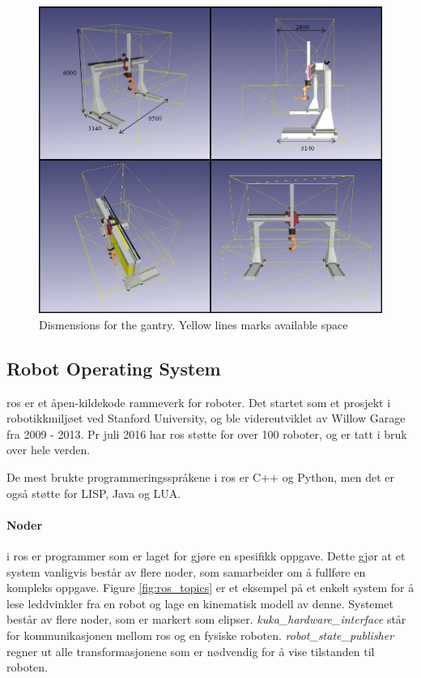 \documentclass{article}
\begin{document}
\begin{figure}[!htbp]
    \centering
    \includegraphics[width=\textwidth]{img/sintef_gantry}
    \caption{Dismensions for the gantry. Yellow lines marks available space\cite{SINTEF:robotlab}}
    \label{fig:gantry_envelope}
\end{figure}


\clearpage

\subsection{Robot Operating System}
\FloatBarrier

\gls{ros} er et åpen-kildekode rammeverk for roboter. Det startet som et prosjekt i robotikkmiljøet ved Stanford University, og ble videreutviklet av Willow Garage fra 2009 - 2013. Pr juli 2016 har \gls{ros} støtte for over 100 roboter, og er tatt i bruk over hele verden\cite{ros:metrics}. 


De mest brukte programmeringsspråkene i \gls{ros} er C++ og Python, men det er også støtte for LISP, Java og LUA.

\paragraph{Noder} i \gls{ros} er programmer som er laget for gjøre en spesifikk oppgave. Dette gjør at et system vanligvis består av flere noder, som samarbeider om å fullføre en kompleks oppgave. Figure \ref{fig:ros_topics} er et eksempel på et enkelt system for å lese leddvinkler fra en robot og lage en kinematisk modell av denne. Systemet består av flere noder, som er markert som elipser. \emph{kuka\_hardware\_interface} står for kommunikasjonen mellom \gls{ros} og en fysiske roboten. \textit{robot\_state\_publisher} regner ut alle transformasjonene som er nødvendig for å vise tilstanden til roboten. 
\end{document}
